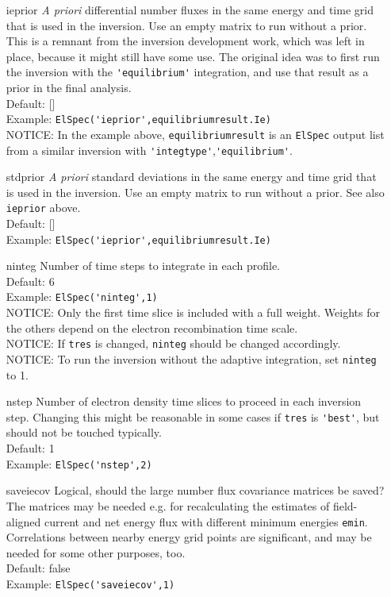 \documentclass[12pt,a4paper]{report}
\begin{document}
\begin{itemize}
\item[ieprior] \emph{A priori} differential number fluxes in the same energy and time grid that is used in the inversion. Use an empty matrix to run without a prior.  This is a remnant from the inversion development work, which was left in place, because it might still have some use. The original idea was to first run the inversion with the \verb|'equilibrium'| integration, and use that result as a prior in the final analysis. \\
Default: []\\
Example: \verb|ElSpec('ieprior',equilibriumresult.Ie)| \\
NOTICE: In the example above, \verb|equilibriumresult| is an \verb|ElSpec| output list from a similar inversion with \verb|'integtype'|,\verb|'equilibrium'|.\\

\item[stdprior] \emph{A priori} standard deviations in the same energy and time grid that is used in the inversion. Use an empty matrix to run without a prior. See also \verb|ieprior| above. \\
Default: [] \\
Example: \verb|ElSpec('ieprior',equilibriumresult.Ie)|\\

\item[ninteg] Number of time steps to integrate in each profile. \\
Default: 6 \\
Example: \verb|ElSpec('ninteg',1)| \\
NOTICE: Only the first time slice is included with a full weight. Weights for the others depend on the electron recombination time scale. \\
NOTICE: If \verb|tres| is changed, \verb|ninteg| should be changed accordingly. \\
NOTICE: To run the inversion without the adaptive integration, set \verb|ninteg| to 1. 

\item[nstep] Number of electron density time slices to proceed in each inversion step. Changing this might be reasonable in some cases if \verb|tres| is \verb|'best'|, but should not be touched typically.\\
Default: 1\\
Example: \verb|ElSpec('nstep',2)|\\

\item[saveiecov] Logical, should the large number flux covariance matrices be saved? The matrices may be needed e.g. for recalculating the estimates of field-aligned current and net energy flux with different minimum energies \verb|emin|. Correlations between nearby energy grid points are significant, and may be needed for some other purposes, too. \\
Default: false\\
Example: \verb|ElSpec('saveiecov',1)|\\

\end{itemize}
\end{document}
